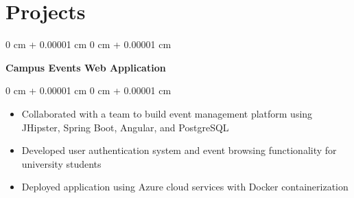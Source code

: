 \documentclass[10pt, a4paper]{article}
\newenvironment{highlights}{
    \begin{itemize}[
        topsep=0.10 cm,
        parsep=0.10 cm,
        partopsep=0pt,
        itemsep=0pt,
        leftmargin=20pt
    ]
}{
    \end{itemize}
} %
\newenvironment{onecolentry}{
    \begin{adjustwidth}{
        0 cm + 0.00001 cm
    }{
        0 cm + 0.00001 cm
    }
}{
    \end{adjustwidth}
} %
\newenvironment{twocolentry}[2][]{
    \onecolentry
    \def\secondColumn{#2}
    \setcolumnwidth{\fill, 4.5 cm}
    \begin{paracol}{2}
}{
    \switchcolumn \raggedleft \secondColumn
    \end{paracol}
    \endonecolentry
} %
\begin{document}
    \vspace{0.15 cm}

    \section{Projects}




    \begin{onecolentry}
        \textbf{Campus Events Web Application}
    \end{onecolentry}

    \vspace{0.10 cm}
    \begin{onecolentry}
        \begin{highlights}
            \item Collaborated with a team to build event management platform using JHipster, Spring Boot, Angular, and PostgreSQL
            \item Developed user authentication system and event browsing functionality for university students
            \item Deployed application using Azure cloud services with Docker containerization
        \end{highlights}
    \end{onecolentry}
\end{document}
